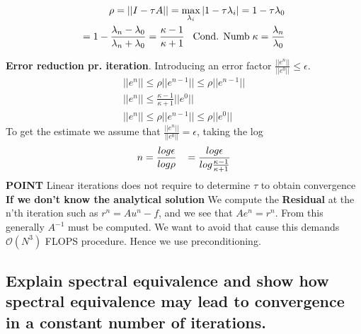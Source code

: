 \documentclass[a4paper,norsk]{article}
\begin{document}
\begin{align*}
\rho = ||I - \tau A ||= \max_{\lambda_i} |1 - \tau \lambda_i | = 1 - \tau \lambda_0 \\
= 1 - \frac{\lambda_n - \lambda_0}{\lambda_n + \lambda_0} = \frac{\kappa - 1}{\kappa + 1} \hspace{3mm} \text{Cond. Numb} \hspace{1mm} \kappa = \frac{\lambda_n}{\lambda_0}
\end{align*}

\textbf{Error reduction pr. iteration}. Introducing an error factor $ \frac{||e^n||}{||e^0||} \leq \epsilon$.
\begin{align*}
||e^n|| \leq \rho ||e^{n-1}|| \leq \rho ||e^{n-1}|| \\
||e^n|| \leq \frac{\kappa -1}{\kappa + 1} ||e^0|| \\
||e^n|| \leq \rho ||e^{n-1}|| \leq \rho ||e^0||
\end{align*}
To get the estimate we assume that $ \frac{||e^n||}{||e^0||} = \epsilon$, taking the log
\begin{align*}
n = \frac{log \epsilon}{log \rho} \hspace{3mm}  = \frac{log \epsilon}{log \frac{\kappa - 1}{\kappa + 1} }
\end{align*}
\textbf{POINT} Linear iterations does not require to determine $\tau$ to obtain convergence \newline
\textbf{If we don't know the analytical solution}
We compute the \textbf{Residual} at the n'th iteration such as $r^n = Au^n - f$, and we see that $Ae^n = r^n$. From this 
generally $A^{-1}$ must be computed. We want to avoid that cause this demands $\mathcal{O}(N^3)$ FLOPS procedure. Hence we use preconditioning. 

\subsection*{ Explain spectral equivalence and show
how spectral equivalence may lead to convergence in a constant number of
iterations.}
\end{document}
